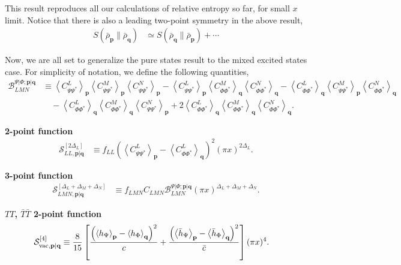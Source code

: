 \documentclass[11pt]{article}
\newcommand{\nn}{\nonumber}
\begin{document}
This result reproduces all our calculations of relative entropy so far, for small $x$ limit.
Notice that there is also a leading two-point symmetry in the above result, 
\begin{align}
    S(\bar{\rho}_\textbf{p} \| \bar{\rho}_\textbf{q}) &\simeq  S(\bar{\rho}_\textbf{q} \| \bar{\rho}_\textbf{p}) +\cdots
\end{align}

Now, we are all set to generalize the pure states result to the mixed excited states case. For simplicity of notation, we define the following quantities,
\begin{align}
\mathcal B_{LMN}^{\Psi|\Phi;\mathbf p|\mathbf q}
&\equiv{}
\left\langle C_{\Psi\Psi^*}^{L}\right\rangle_{\mathbf p}
\left\langle C_{\Psi\Psi^*}^{M}\right\rangle_{\mathbf p}
\left\langle C_{\Psi\Psi^*}^{N}\right\rangle_{\mathbf p}
-
\left\langle C_{\Psi\Psi^*}^{L}\right\rangle_{\mathbf p}
\left\langle C_{\Phi\Phi^*}^{M}\right\rangle_{\mathbf q}
\left\langle C_{\Phi\Phi^*}^{N}\right\rangle_{\mathbf q}
-
\left\langle C_{\Phi\Phi^*}^{L}\right\rangle_{\mathbf q}
\left\langle C_{\Psi\Psi^*}^{M}\right\rangle_{\mathbf p}
\left\langle C_{\Phi\Phi^*}^{N}\right\rangle_{\mathbf q}
\nn\\
&\quad
-
\left\langle C_{\Phi\Phi^*}^{L}\right\rangle_{\mathbf q}
\left\langle C_{\Phi\Phi^*}^{M}\right\rangle_{\mathbf q}
\left\langle C_{\Psi\Psi^*}^{N}\right\rangle_{\mathbf p}
+
2
\left\langle C_{\Phi\Phi^*}^{L}\right\rangle_{\mathbf q}
\left\langle C_{\Phi\Phi^*}^{M}\right\rangle_{\mathbf q}
\left\langle C_{\Phi\Phi^*}^{N}\right\rangle_{\mathbf q}.
\end{align}

\textbf{2-point function}
\begin{align}
    \mathcal S_{LL,\mathbf p|\mathbf q}^{[2\Delta_L]}
    &\equiv
    f_{LL}
    \left(
    \left\langle C_{\Psi\Psi^*}^{L}\right\rangle_{\mathbf p}
    -
    \left\langle C_{\Phi\Phi^*}^{L}\right\rangle_{\mathbf q}
    \right)^2
    (\pi x)^{2\Delta_L}.
\end{align}

\textbf{3-point function}
\begin{align}
    \mathcal S_{LMN,\mathbf p|\mathbf q}^{[\Delta_L+\Delta_M+\Delta_N]}
    &\equiv
    f_{LMN}C_{LMN}
    \mathcal B_{LMN}^{\Psi|\Phi;\mathbf p|\mathbf q}
    (\pi x)^{\Delta_L+\Delta_M+\Delta_N}.
\end{align}

\textbf{$TT$, $\bar T\bar T$ 2-point function}
\begin{align}
    \mathcal S_{{\rm vac},\mathbf p|\mathbf q}^{[4]}
    &\equiv
    \frac{8}{15}
    \left[
    \frac{
    \left(
    \left\langle h_\Psi\right\rangle_{\mathbf p}
    -
    \left\langle h_\Phi\right\rangle_{\mathbf q}
    \right)^2
    }{c}
    +
    \frac{
    \left(
    \left\langle \bar h_\Psi\right\rangle_{\mathbf p}
    -
    \left\langle \bar h_\Phi\right\rangle_{\mathbf q}
    \right)^2
    }{\bar c}
    \right]
    (\pi x)^4 .
\end{align}
\end{document}
